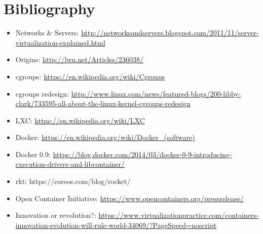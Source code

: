 \documentclass{beamer}
\begin{document}
\section{Bibliography}
\begin{frame}
\begingroup
\fontsize{6pt}{8pt}\selectfont
\begin{itemize}
\item Networks \& Servers: \url{http://networksandservers.blogspot.com/2011/11/server-virtualization-explained.html}
\item Origins: \url{http://lwn.net/Articles/236038/}
\item cgroups: \url{https://en.wikipedia.org/wiki/Cgroups}
\item cgroups redesign: \url{http://www.linux.com/news/featured-blogs/200-libby-clark/733595-all-about-the-linux-kernel-cgroups-redesign}
\item LXC: \url{https://en.wikipedia.org/wiki/LXC}
\item Docker: \url{https://en.wikipedia.org/wiki/Docker_(software)}
\item Docker 0.9: \url{https://blog.docker.com/2014/03/docker-0-9-introducing-execution-drivers-and-libcontainer/}
\item rkt: https://coreos.com/blog/rocket/
\item Open Container Initiative: \url{https://www.opencontainers.org/pressrelease/}
\item Innovation or revolution?: \url{https://www.virtualizationpractice.com/containers-innovation-evolution-will-rule-world-34069/?PageSpeed=noscript}
\end{itemize}
\endgroup
\end{frame}
\end{document}
